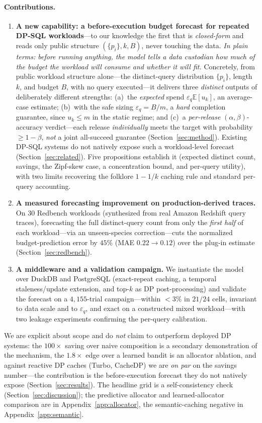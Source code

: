 \documentclass[sigconf,nonacm]{acmart}
\newcommand{\eps}{\varepsilon}
\newcommand{\E}{\mathbb{E}}
\begin{document}
\paragraph{Contributions.}
\begin{enumerate}
  \item \textbf{A new capability: a before-execution budget forecast for repeated DP-SQL workloads}---to our knowledge the first that is \emph{closed-form} and reads only public structure $(\{p_i\},k,B)$, never touching the data. \emph{In plain terms: before running anything, the model tells a data custodian how much of the budget the workload will consume and whether it will fit.} Concretely, from public workload structure alone---the distinct-query distribution $\{p_i\}$, length $k$, and budget $B$, with no query executed---it delivers three \emph{distinct} outputs of deliberately different strengths: (a)~the \emph{expected} spend $\eps_q\E[u_k]$, an average-case estimate; (b)~with the safe sizing $\eps_q{=}B/m$, a \emph{hard} completion guarantee, since $u_k\le m$ in the static regime; and (c)~a \emph{per-release} $(\alpha,\beta)$-accuracy verdict---each release \emph{individually} meets the target with probability $\ge1-\beta$, \emph{not} a joint all-succeed guarantee (Section~\ref{sec:method}). Existing DP-SQL systems do not natively expose such a workload-level forecast (Section~\ref{sec:related}). Five propositions establish it (expected distinct count, savings, the Zipf-skew case, a concentration bound, and per-query utility), with two limits recovering the folklore $1-1/k$ caching rule and standard per-query accounting.
  \item \textbf{A measured forecasting improvement on production-derived traces.} On $30$ Redbench workloads (synthesized from real Amazon Redshift query traces), forecasting the full distinct-query count from only the \emph{first half} of each workload---via an unseen-species correction---cuts the normalized budget-prediction error by $45\%$ (MAE $0.22\!\to\!0.12$) over the plug-in estimate (Section~\ref{sec:redbench}).
  \item \textbf{A middleware and a validation campaign.} We instantiate the model over DuckDB and PostgreSQL (exact-repeat caching, a temporal staleness/update extension, and top-$k$ as DP post-processing) and validate the forecast on a $4{,}155$-trial campaign---within $<3\%$ in $21/24$ cells, invariant to data scale and to $\eps_q$, and exact on a constructed mixed workload---with two leakage experiments confirming the per-query calibration.
\end{enumerate}
We are explicit about scope and do \emph{not} claim to outperform deployed DP systems: the $100\times$ saving over naive composition is a secondary demonstration of the mechanism, the $1.8\times$ edge over a learned bandit is an allocator ablation, and against reactive DP caches (Turbo, CacheDP) we are \emph{on par} on the savings number---the contribution is the before-execution forecast they do not natively expose (Section~\ref{sec:results}). The headline grid is a self-consistency check (Section~\ref{sec:discussion}); the predictive allocator and learned-allocator comparison are in Appendix~\ref{app:allocator}, the semantic-caching negative in Appendix~\ref{app:semantic}.
\end{document}
